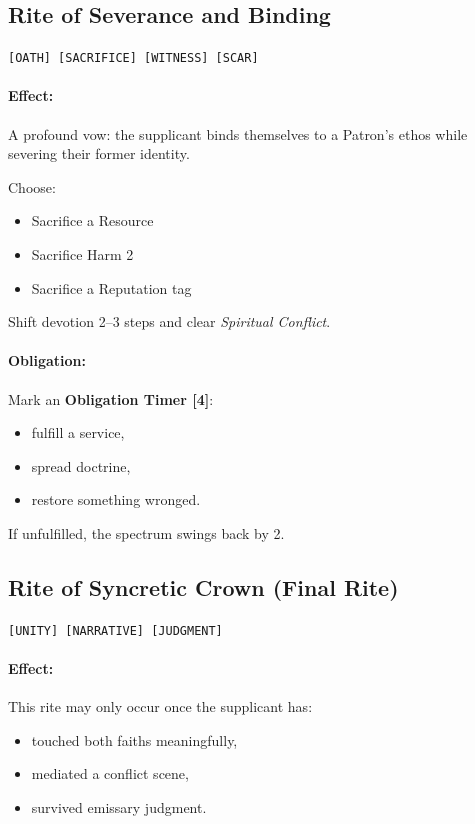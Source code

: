 \documentclass[11pt]{article}
\begin{document}
\subsection*{Rite of Severance and Binding}
 \quad \texttt{[OATH] [SACRIFICE] [WITNESS] [SCAR]}

\paragraph{Effect:}
A profound vow: the supplicant binds themselves to a Patron's ethos while
severing their former identity.

Choose:
\begin{itemize}
  \item Sacrifice a Resource
  \item Sacrifice Harm 2
  \item Sacrifice a Reputation tag
\end{itemize}

Shift devotion 2--3 steps and clear \emph{Spiritual Conflict}.

\paragraph{Obligation:}
Mark an \textbf{Obligation Timer [4]}:
\begin{itemize}
  \item fulfill a service,
  \item spread doctrine,
  \item restore something wronged.
\end{itemize}

If unfulfilled, the spectrum swings back by 2.

\subsection*{Rite of Syncretic Crown (Final Rite)}
 \quad \texttt{[UNITY] [NARRATIVE] [JUDGMENT]}

\paragraph{Effect:}
This rite may only occur once the supplicant has:
\begin{itemize}
  \item touched both faiths meaningfully,
  \item mediated a conflict scene,
  \item survived emissary judgment.
\end{itemize}
\end{document}
